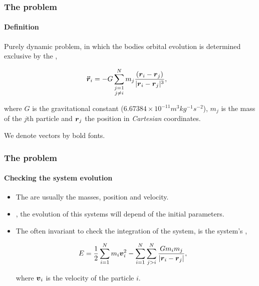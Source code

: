 \begin{frame}
    \frametitle{The {\nbody} problem}
    \framesubtitle{Definition}

    Purely dynamic problem, in which the bodies orbital evolution
    is determined exclusive by the ,

    \begin{align}
        \boldsymbol{\ddot{r}}_{i} &= -G \sum\limits^{N}_{\substack{j=1\\j\neq i}}
                              m_{j} {(\boldsymbol{r}_i - \boldsymbol{r}_j)\over
                              | \boldsymbol{r}_i - \boldsymbol{r}_j|^{3}}\label{eq:nbody},
    \end{align}

    \noindent
    where $G$ is the gravitational constant
    ($6.67384\times 10^{-11} m^{3} kg^{-1} s^{-2}$),
    $m_j$ is the mass of the $j$th particle
    and $\boldsymbol{r}_j$ the position in \emph{Cartesian} coordinates.
    \begin{block}{}
        We denote vectors by bold fonts.
    \end{block}

\end{frame}


\begin{frame}
    \frametitle{The {\nbody} problem}
    \framesubtitle{Checking the system evolution}

    \begin{itemize}
        \item The  are usually the masses,
            position and velocity.

        \item {}, the evolution of this systems
         will depend of the initial parameters.

        \item The often invariant to check the integration of the system,
            is the system's ,

            \begin{align}
                E &= {1 \over 2} \sum\limits^{N}_{i=1} m_{i} \boldsymbol{v}_{i}^{2} -
                     \sum\limits_{i=1}^{N} \sum\limits_{j > i}^{N}
                     {G m_{i} m_{j} \over |\boldsymbol{r}_{i} - \boldsymbol{r}_{j}|},
            \end{align}

            \noindent
            where $\boldsymbol{v}_i$ is the velocity of the particle $i$.
    \end{itemize}

\end{frame}


